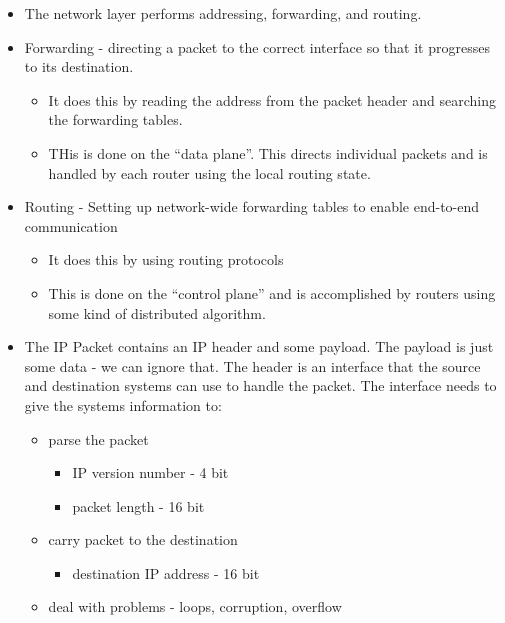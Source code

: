 \documentclass[]{article}
\providecommand{\tightlist}{%
  \setlength{\itemsep}{0pt}\setlength{\parskip}{0pt}}
\begin{document}
\begin{itemize}
\tightlist
\item
  The network layer performs addressing, forwarding, and routing.
\item
  Forwarding - directing a packet to the correct interface so that it
  progresses to its destination.

  \begin{itemize}
  \tightlist
  \item
    It does this by reading the address from the packet header and
    searching the forwarding tables.
  \item
    THis is done on the ``data plane''. This directs individual packets
    and is handled by each router using the local routing state.
  \end{itemize}
\item
  Routing - Setting up network-wide forwarding tables to enable
  end-to-end communication

  \begin{itemize}
  \tightlist
  \item
    It does this by using routing protocols
  \item
    This is done on the ``control plane'' and is accomplished by routers
    using some kind of distributed algorithm.
  \end{itemize}
\item
  The IP Packet contains an IP header and some payload. The payload is
  just some data - we can ignore that. The header is an interface that
  the source and destination systems can use to handle the packet. The
  interface needs to give the systems information to:

  \begin{itemize}
  \tightlist
  \item
    parse the packet

    \begin{itemize}
    \tightlist
    \item
      IP version number - 4 bit
    \item
      packet length - 16 bit
    \end{itemize}
  \item
    carry packet to the destination

    \begin{itemize}
    \tightlist
    \item
      destination IP address - 16 bit
    \end{itemize}
  \item
    deal with problems - loops, corruption, overflow


\end{itemize}
\end{itemize}
\end{document}
